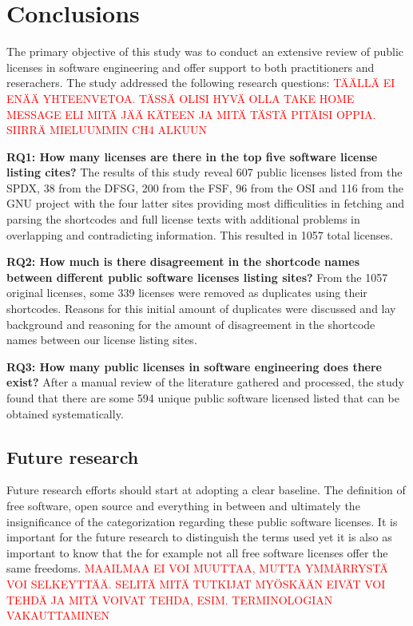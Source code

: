 \chapter{Conclusions\label{conclusions}}
The primary objective of this study was to conduct an extensive review of public licenses in software engineering and offer support to both practitioners and reserachers. The study addressed the following research questions: \textcolor{red}{TÄÄLLÄ EI ENÄÄ YHTEENVETOA. TÄSSÄ OLISI HYVÄ OLLA TAKE HOME MESSAGE ELI MITÄ JÄÄ KÄTEEN JA MITÄ TÄSTÄ PITÄISI OPPIA. SIIRRÄ MIELUUMMIN CH4 ALKUUN}

\textbf{RQ1: How many licenses are there in the top five software license listing cites?} The results of this study reveal 607 public licenses listed from the SPDX, 38 from the DFSG, 200 from the FSF, 96 from the OSI and 116 from the GNU project with the four latter sites providing most difficulities in fetching and parsing the shortcodes and full license texts with additional problems in overlapping and contradicting information. This resulted in 1057 total licenses.

\textbf{RQ2: How much is there disagreement in the shortcode names between different public software licenses listing sites?} From the 1057 original licenses, some 339 licenses were removed as duplicates using their shortcodes. Reasons for this initial amount of duplicates were discussed and lay background and reasoning for the amount of disagreement in the shortcode names between our license listing sites.

\textbf{RQ3: How many public licenses in software engineering does there exist?} After a manual review of the literature gathered and processed, the study found that there are some 594 unique public software licensed listed that can be obtained systematically. 


\section{Future research}
Future research efforts should start at adopting a clear baseline. The definition of free software, open source and everything in between and ultimately the insignificance of the categorization regarding these public software licenses. It is important for the future research to distinguish the terms used yet it is also as important to know that the for example not all free software licenses offer the same freedoms. \textcolor{red}{MAAILMAA EI VOI MUUTTAA, MUTTA YMMÄRRYSTÄ VOI SELKEYTTÄÄ. SELITÄ MITÄ TUTKIJAT MYÖSKÄÄN EIVÄT VOI TEHDÄ JA MITÄ VOIVAT TEHDA, ESIM. TERMINOLOGIAN VAKAUTTAMINEN}

